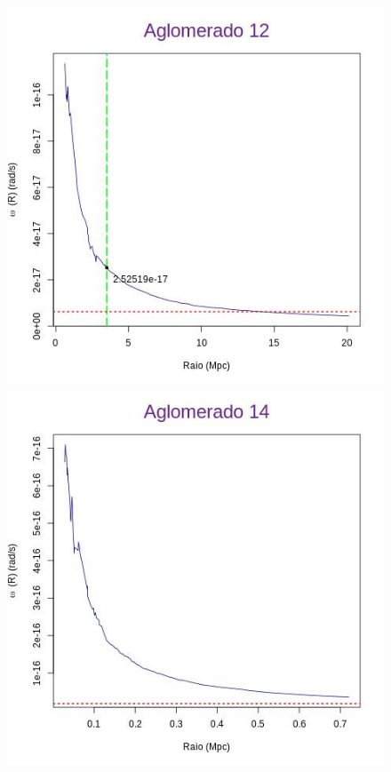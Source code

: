 \begin{apendicesenv}
\begin{figure}[H]
\begin{center}
\includegraphics[scale=.3]{04-figuras/selec20/perfil12}
\includegraphics[scale=.3]{04-figuras/selec20/perfil14}

\end{center}
\end{figure}
\end{apendicesenv}
